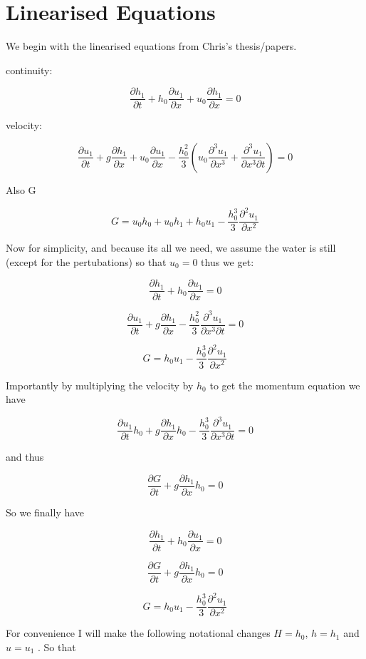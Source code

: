 \documentclass[12pt]{article}
\begin{document}
\section{Linearised Equations}

We begin with the linearised equations from Chris's thesis/papers.


continuity:

\[\frac{\partial  h_1}{\partial  t} + h_0\frac{\partial  u_1}{\partial  x} + u_0\frac{\partial  h_1}{\partial  x} = 0 \]

velocity:

\[\frac{\partial  u_1}{\partial  t} + g\frac{\partial  h_1}{\partial  x} + u_0\frac{\partial  u_1}{\partial  x} - \frac{h_0^2}{3}\left(u_0\frac{\partial^3  u_1}{\partial  x^3} + \frac{\partial^3  u_1}{\partial  x^3 \partial  t}  \right)  = 0 \]

Also G

\[G = u_0h_0 + u_0h_1 + h_0u_1 -\frac{h_0^3}{3} \frac{\partial^2 u_1}{\partial x^2}\]

Now for simplicity, and because its all we need, we assume the water is still (except for the pertubations) so that $u_0 = 0$ thus we get:

\[\frac{\partial  h_1}{\partial  t} + h_0\frac{\partial  u_1}{\partial  x} = 0 \]

\[\frac{\partial  u_1}{\partial  t} + g\frac{\partial  h_1}{\partial  x}  - \frac{h_0^2}{3} \frac{\partial^3  u_1}{\partial  x^3 \partial  t}   = 0 \]

\[G = h_0u_1 -\frac{h_0^3}{3} \frac{\partial^2 u_1}{\partial x^2}\]

Importantly by multiplying the velocity by $h_0$ to get the momentum equation we have

\[\frac{\partial  u_1}{\partial  t}h_0 + g\frac{\partial  h_1}{\partial  x}h_0  - \frac{h_0^3}{3} \frac{\partial^3  u_1}{\partial  x^3 \partial  t}   = 0 \]

and thus

\[\frac{\partial  G}{\partial  t} + g\frac{\partial  h_1}{\partial  x}h_0   = 0 \]

So we finally have 

\[\frac{\partial  h_1}{\partial  t} + h_0\frac{\partial  u_1}{\partial  x} = 0 \]

\[\frac{\partial  G}{\partial  t} + g\frac{\partial  h_1}{\partial  x}h_0   = 0 \]

\[G = h_0u_1 -\frac{h_0^3}{3} \frac{\partial^2 u_1}{\partial x^2}\]

For convenience I will make the following notational changes $H = h_0$, $h = h_1$ and $u = u_1$ . So that 
\end{document}
